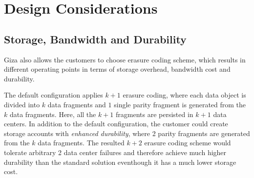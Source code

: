 \section{Design Considerations}
\label{sec:motivation}

%
%

\subsection{Storage, Bandwidth and Durability}

Giza also allows the customers to choose erasure coding scheme, which results in different operating points in terms of storage overhead, bandwidth cost and durability. 

The default configuration applies $k+1$ erasure coding, where each data object is divided into $k$ data fragments and $1$ single parity fragment is generated from the $k$ data fragments. Here, all the $k+1$ fragments are persisted in $k+1$ data centers. In addition to the default configuration, the customer could create storage accounts with {\em enhanced durability}, where 2 parity fragments are generated from the $k$ data fragments. The resulted $k+2$ erasure coding scheme would tolerate arbitrary 2 data center failures and therefore achieve much higher durability than the standard solution eventhough it has a much lower storage cost. 

